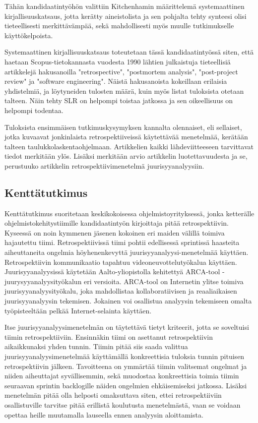 Tähän kandidaatintyöhön valittiin Kitchenhamin määrittelemä systemaattinen kirjallisuuskatsaus, jotta kerätty aineistolista ja sen pohjalta tehty synteesi olisi tieteellisesti merkittävämpää, sekä mahdollisesti myös muulle tutkimukselle käyttökelpoista.

Systemaattinen kirjallisuuskatsaus toteutetaan tässä kandidaatintyössä siten, että haetaan Scopus-tietokannasta vuodesta 1990 lähtien julkaistuja tieteellisiä artikkelejä hakusanoilla "retrospective",  "postmortem analysis", "post-project review" ja "software engineering". Näistä hakusanoista kokeillaan erilaisia yhdistelmiä, ja löytyneiden tulosten määrä, kuin myös listat tuloksista otetaan talteen. Näin tehty SLR on helpompi toistaa jatkossa ja sen oikeellisuus on helpompi todentaa.

Tuloksista ensimmäisen tutkimuskysymyksen kannalta olennaiset, eli sellaiset, jotka kuvaavat jonkinlaista retrospektiiveissä käytettävää menetelmää, kerätään talteen taulukkolaskentaohjelmaan. Artikkelien kaikki lähdeviitteeseen tarvittavat tiedot merkitään ylös. Lisäksi merkitään arvio artikkelin luotettavuudesta ja se, perustuuko artikkelin retrospektiivimenetelmä juurisyyanalyysiin.


\subsection{Kenttätutkimus}
Kenttätutkimus suoritetaan keskikokoisessa ohjelmistoyrityksessä, jonka ketterälle ohjelmistokehitystiimille kandidaatintyön kirjoittaja pitää retrospektiivin. Kyseessä on noin kymmenen jäsenen kokoinen eri maiden välillä toimiva hajautettu tiimi. Retrospektiivissä tiimi pohtii edellisessä sprintissä haasteita aiheuttaneita ongelmia höyhenenkevyttä juurisyyanalyysi-menetelmää käyttäen. Retrospektiivin kommunikaatio tapahtuu videoneuvottelutyökalua käyttäen. Juurisyyanalyysissä käytetään Aalto-yliopistolla kehitettyä ARCA-tool -juurysyyanalyysityökalun \citep{ArcaTool} eri versioita. ARCA-tool on Internetin ylitse toimiva juurisyyanalyysityökalu, joka mahdollistaa kollaboratiivisen ja reaaliaikaisen juurisyyanalyysin tekemisen. Jokainen voi osallistua analyysin tekemiseen omalta työpisteeltään pelkää Internet-selainta käyttäen.

Itse juurisyyanalyysimenetelmän on täytettävä tietyt kriteerit, jotta se soveltuisi tiimin retrospektiiviin. Ensinnäkin tiimi on asettanut retrospektiivin aikaikkunaksi yhden tunnin. Tiimin pitää siis saada valittua juurisyyanalyysimenetelmää käyttämällä konkreettisia tuloksia tunnin pituisen retrospektiivin jälkeen. Tavoitteena on ymmärtää tiimin valitsemat ongelmat ja niiden aiheuttajat syvällisemmin, sekä muodostaa konkreettisia toimia tiimin seuraavan sprintin backlogille näiden ongelmien ehkäisemiseksi jatkossa. Lisäksi menetelmän pitää olla helposti omaksuttava siten, ettei retrospektiiviin osallistuville tarvitse pitää erillistä koulutusta menetelmästä, vaan se voidaan opettaa heille muutamalla lauseella ennen analyysin aloittamista.

